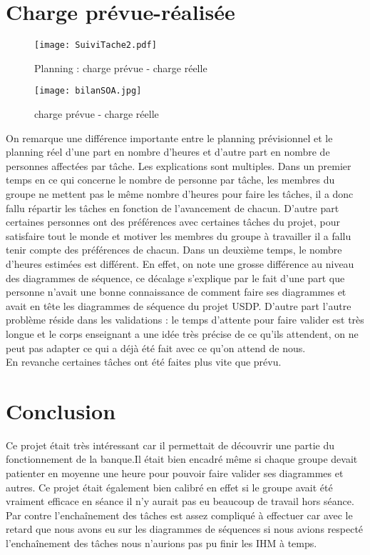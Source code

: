 \section {Charge prévue-réalisée}

\begin{figure}[H]
	\begin{center}
		\texttt{[image: SuiviTache2.pdf]}
		\caption{Planning : charge prévue - charge réelle}
	\end{center}
\end{figure}

\begin{figure}[H]
	\begin{center}
		\texttt{[image: bilanSOA.jpg]}
		\caption{charge prévue - charge réelle}
	\end{center}
\end{figure}

On remarque une différence importante entre le planning prévisionnel et le planning réel d'une part en nombre d'heures et d'autre part en nombre de personnes affectées par tâche. Les explications sont multiples. Dans un premier temps en ce qui concerne le nombre de personne par tâche, les membres du groupe ne mettent pas le même nombre d'heures pour faire les tâches, il a donc fallu répartir les tâches en fonction de l'avancement de chacun. D'autre part certaines personnes ont des préférences avec certaines tâches du projet, pour satisfaire tout le monde et motiver les membres du groupe à travailler il a fallu tenir compte des préférences de chacun. Dans un deuxième temps, le nombre d'heures estimées est différent. En effet, on note une grosse différence au niveau des diagrammes de séquence, ce décalage s'explique par le fait d'une part que personne n'avait une bonne connaissance de comment faire ses diagrammes et avait en tête les diagrammes de séquence du projet USDP. D'autre part l'autre problème réside dans les validations : le temps d'attente pour faire valider est très longue et le corps enseignant a une idée très précise de ce qu'ils attendent, on ne peut pas adapter ce qui a déjà été fait avec ce qu'on attend de nous. \\
En revanche certaines tâches ont été faites plus vite que prévu.

\section{Conclusion}
Ce projet était très intéressant car il permettait de découvrir une partie du fonctionnement de la banque.Il était bien encadré m\^eme si chaque groupe devait patienter en moyenne une heure pour pouvoir faire valider ses diagrammes et autres. Ce projet était également bien calibré en effet si le groupe avait été vraiment efficace en séance il n'y aurait pas eu beaucoup de travail hors séance. Par contre l'enchaînement des t\^aches est assez compliqué à effectuer car avec le retard que nous avons eu sur les diagrammes de séquences si nous avions respecté l'enchaînement des t\^aches nous n'aurions pas pu finir les IHM à temps.  